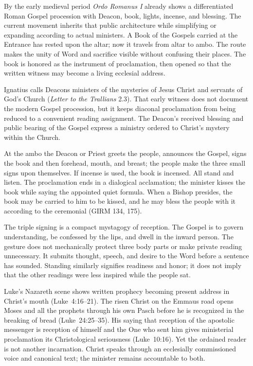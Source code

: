 By the early medieval period \emph{Ordo Romanus I} already shows a differentiated Roman Gospel procession with Deacon, book, lights, incense, and blessing. The current movement inherits that public architecture while simplifying or expanding according to actual ministers. A Book of the Gospels carried at the Entrance has rested upon the altar; now it travels from altar to ambo. The route makes the unity of Word and sacrifice visible without confusing their places. The book is honored as the instrument of proclamation, then opened so that the written witness may become a living ecclesial address.

Ignatius calls Deacons ministers of the mysteries of Jesus Christ and servants of God's Church (\emph{Letter to the Trallians} 2.3). That early witness does not document the modern Gospel procession, but it keeps diaconal proclamation from being reduced to a convenient reading assignment. The Deacon's received blessing and public bearing of the Gospel express a ministry ordered to Christ's mystery within the Church.


At the ambo the Deacon or Priest greets the people, announces the Gospel, signs the book and then forehead, mouth, and breast; the people make the three small signs upon themselves. If incense is used, the book is incensed. All stand and listen. The proclamation ends in a dialogical acclamation; the minister kisses the book while saying the appointed quiet formula. When a Bishop presides, the book may be carried to him to be kissed, and he may bless the people with it according to the ceremonial (GIRM 134, 175).

The triple signing is a compact mystagogy of reception. The Gospel is to govern understanding, be confessed by the lips, and dwell in the inward person. The gesture does not mechanically protect three body parts or make private reading unnecessary. It submits thought, speech, and desire to the Word before a sentence has sounded. Standing similarly signifies readiness and honor; it does not imply that the other readings were less inspired while the people sat.

Luke's Nazareth scene shows written prophecy becoming present address in Christ's mouth (Luke~4:16--21). The risen Christ on the Emmaus road opens Moses and all the prophets through his own Pasch before he is recognized in the breaking of bread (Luke~24:25--35). His saying that reception of the apostolic messenger is reception of himself and the One who sent him gives ministerial proclamation its Christological seriousness (Luke~10:16). Yet the ordained reader is not another incarnation. Christ speaks through an ecclesially commissioned voice and canonical text; the minister remains accountable to both.

